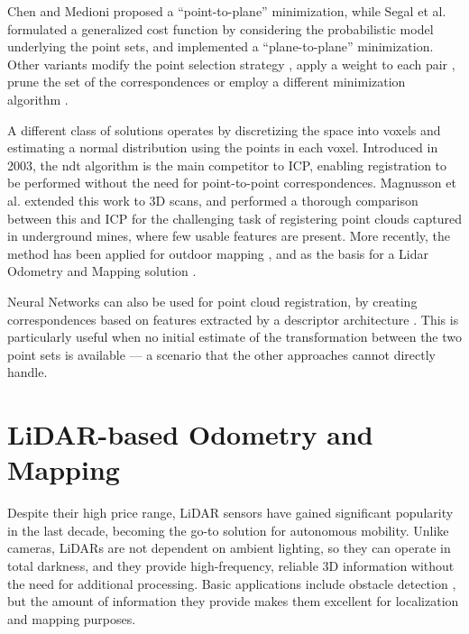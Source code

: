 Chen and Medioni \cite{chen1991pointtoplane} proposed a ``point-to-plane'' minimization, while Segal et al. \cite{segal2009generalized} formulated a generalized cost function by considering the probabilistic model underlying the point sets, and implemented a ``plane-to-plane'' minimization. Other variants modify the point selection strategy \cite{masuda96icp,turk1994zippered}, apply a weight to each pair \cite{godin1994three}, prune the set of the correspondences \cite{pulli1999multiview,bouaziz2013sparse} or employ a different minimization algorithm \cite{blais1995registering}.

A different class of solutions operates by discretizing the space into \glspl{voxel} and estimating a normal distribution using the points in each voxel. Introduced in 2003, the \acrfull{ndt} \cite{biber2003normal} algorithm is the main competitor to ICP, enabling registration to be performed without the need for point-to-point correspondences. Magnusson et al. \cite{magnusson2007scan} extended this work to 3D scans, and performed a thorough comparison between this and ICP \cite{magnusson2009evaluation} for the challenging task of registering point clouds captured in underground mines, where few usable features are present. More recently, the method has been applied for outdoor mapping \cite{shen2024}, and as the basis for a Lidar Odometry and Mapping solution \cite{chen2021ndt}.

Neural Networks can also be used for point cloud registration, by creating correspondences based on features extracted by a descriptor architecture \cite{gojcic2019perfect,deng2018ppfnet}. This is particularly useful when no initial estimate of the transformation between the two point sets is available --- a scenario that the other approaches cannot directly handle.

\section{LiDAR-based Odometry and Mapping}

Despite their high price range, LiDAR sensors have gained significant popularity in the last decade, becoming the go-to solution for autonomous mobility. Unlike cameras, LiDARs are not dependent on ambient lighting, so they can operate in total darkness, and they provide high-frequency, reliable 3D information without the need for additional processing. Basic applications include obstacle detection \cite{asvadi20163d,chen2017lidar}, but the amount of information they provide makes them excellent for localization and mapping purposes.

